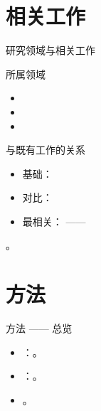 
\renewcommand{\secblurb}{\ph{本节一句话主旨：相对已有工作的关键差异}}
\section{相关工作}

\begin{frame}{研究领域与相关工作}
  \begin{block}{所属领域}
    \begin{itemize}
      \item {}
      \item {}
      \item {}
    \end{itemize}
  \end{block}
  \tightgap
  \begin{block}{与既有工作的关系}
    \begin{itemize}
      \item 基础：
      \item 对比：
      \item 最相关： —— 
    \end{itemize}
  \end{block}
  \tightgap
  \begin{callout}[关键差异]
    。
  \end{callout}
\end{frame}

\renewcommand{\secblurb}{\ph{本节一句话主旨：方法的核心思想与组成}}
\section{方法}

\begin{frame}{方法 —— 总览}
  \begin{itemize}
    \item {}：。
    \item {}：。
    \item {}。
  \end{itemize}
\end{frame}

